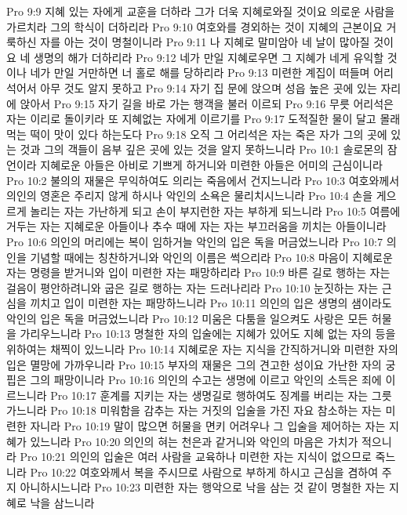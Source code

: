 Pro 9:9  지혜 있는 자에게 교훈을 더하라 그가 더욱 지혜로와질 것이요 의로운 사람을 가르치라 그의 학식이 더하리라
Pro 9:10  여호와를 경외하는 것이 지혜의 근본이요 거룩하신 자를 아는 것이 명철이니라
Pro 9:11  나 지혜로 말미암아 네 날이 많아질 것이요 네 생명의 해가 더하리라
Pro 9:12  네가 만일 지혜로우면 그 지혜가 네게 유익할 것이나 네가 만일 거만하면 너 홀로 해를 당하리라
Pro 9:13  미련한 계집이 떠들며 어리석어서 아무 것도 알지 못하고
Pro 9:14  자기 집 문에 앉으며 성읍 높은 곳에 있는 자리에 앉아서
Pro 9:15  자기 길을 바로 가는 행객을 불러 이르되
Pro 9:16  무릇 어리석은 자는 이리로 돌이키라 또 지혜없는 자에게 이르기를
Pro 9:17  도적질한 물이 달고 몰래 먹는 떡이 맛이 있다 하는도다
Pro 9:18  오직 그 어리석은 자는 죽은 자가 그의 곳에 있는 것과 그의 객들이 음부 깊은 곳에 있는 것을 알지 못하느니라
Pro 10:1  솔로몬의 잠언이라 지혜로운 아들은 아비로 기쁘게 하거니와 미련한 아들은 어미의 근심이니라
Pro 10:2  불의의 재물은 무익하여도 의리는 죽음에서 건지느니라
Pro 10:3  여호와께서 의인의 영혼은 주리지 않게 하시나 악인의 소욕은 물리치시느니라
Pro 10:4  손을 게으르게 놀리는 자는 가난하게 되고 손이 부지런한 자는 부하게 되느니라
Pro 10:5  여름에 거두는 자는 지혜로운 아들이나 추수 때에 자는 자는 부끄러움을 끼치는 아들이니라
Pro 10:6  의인의 머리에는 복이 임하거늘 악인의 입은 독을 머금었느니라
Pro 10:7  의인을 기념할 때에는 칭찬하거니와 악인의 이름은 썩으리라
Pro 10:8  마음이 지혜로운 자는 명령을 받거니와 입이 미련한 자는 패망하리라
Pro 10:9  바른 길로 행하는 자는 걸음이 평안하려니와 굽은 길로 행하는 자는 드러나리라
Pro 10:10  눈짓하는 자는 근심을 끼치고 입이 미련한 자는 패망하느니라
Pro 10:11  의인의 입은 생명의 샘이라도 악인의 입은 독을 머금었느니라
Pro 10:12  미움은 다툼을 일으켜도 사랑은 모든 허물을 가리우느니라
Pro 10:13  명철한 자의 입술에는 지혜가 있어도 지혜 없는 자의 등을 위하여는 채찍이 있느니라
Pro 10:14  지혜로운 자는 지식을 간직하거니와 미련한 자의 입은 멸망에 가까우니라
Pro 10:15  부자의 재물은 그의 견고한 성이요 가난한 자의 궁핍은 그의 패망이니라
Pro 10:16  의인의 수고는 생명에 이르고 악인의 소득은 죄에 이르느니라
Pro 10:17  훈계를 지키는 자는 생명길로 행하여도 징계를 버리는 자는 그릇가느니라
Pro 10:18  미워함을 감추는 자는 거짓의 입술을 가진 자요 참소하는 자는 미련한 자니라
Pro 10:19  말이 많으면 허물을 면키 어려우나 그 입술을 제어하는 자는 지혜가 있느니라
Pro 10:20  의인의 혀는 천은과 같거니와 악인의 마음은 가치가 적으니라
Pro 10:21  의인의 입술은 여러 사람을 교육하나 미련한 자는 지식이 없으므로 죽느니라
Pro 10:22  여호와께서 복을 주시므로 사람으로 부하게 하시고 근심을 겸하여 주지 아니하시느니라
Pro 10:23  미련한 자는 행악으로 낙을 삼는 것 같이 명철한 자는 지혜로 낙을 삼느니라

